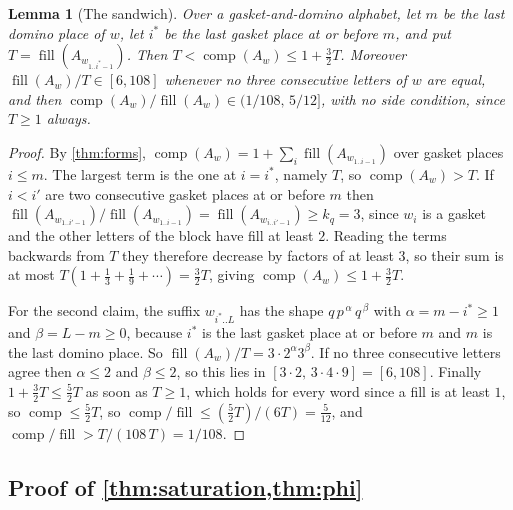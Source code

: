 \documentclass[11pt]{amsart}
\newtheorem{lemma}[theorem]{Lemma}
\theoremstyle{definition}
\theoremstyle{remark}
\DeclareMathOperator{\comp}{comp}
\DeclareMathOperator{\fil}{fill}
\begin{document}
\begin{lemma}[The sandwich]
\label{lem:sandwich}
Over a gasket-and-domino alphabet, let $m$ be the last domino place of $w$, let $i^*$ be the last gasket place at or before $m$, and put $T = \fil(A_{w_{1..i^*-1}})$. Then $T < \comp(A_w) \le 1 + \tfrac32 T$. Moreover $\fil(A_w)/T \in [6, 108]$ whenever no three consecutive letters of $w$ are equal, and then $\comp(A_w)/\fil(A_w) \in (1/108,\, 5/12]$, with no side condition, since $T \ge 1$ always.
\end{lemma}

\begin{proof}
By \cref{thm:forms}, $\comp(A_w) = 1 + \sum_i \fil(A_{w_{1..i-1}})$ over gasket places $i \le m$. The largest term is the one at $i = i^*$, namely $T$, so $\comp(A_w) > T$. If $i < i'$ are two consecutive gasket places at or before $m$ then $\fil(A_{w_{1..i'-1}})/\fil(A_{w_{1..i-1}}) = \fil(A_{w_{i..i'-1}}) \ge k_q = 3$, since $w_i$ is a gasket and the other letters of the block have fill at least $2$. Reading the terms backwards from $T$ they therefore decrease by factors of at least $3$, so their sum is at most $T(1 + \tfrac13 + \tfrac19 + \cdots) = \tfrac32 T$, giving $\comp(A_w) \le 1 + \tfrac32 T$.

For the second claim, the suffix $w_{i^*..L}$ has the shape $q\, p^{\,\alpha}\, q^{\,\beta}$ with $\alpha = m - i^* \ge 1$ and $\beta = L - m \ge 0$, because $i^*$ is the last gasket place at or before $m$ and $m$ is the last domino place. So $\fil(A_w)/T = 3 \cdot 2^{\alpha} 3^{\beta}$. If no three consecutive letters agree then $\alpha \le 2$ and $\beta \le 2$, so this lies in $[3 \cdot 2, \, 3 \cdot 4 \cdot 9] = [6, 108]$. Finally $1 + \tfrac32 T \le \tfrac52 T$ as soon as $T \ge 1$, which holds for every word since a fill is at least $1$, so $\comp \le \tfrac52 T$, so $\comp/\fil \le (\tfrac52 T)/(6T) = \tfrac{5}{12}$, and $\comp/\fil > T/(108\,T) = 1/108$.
\end{proof}

\subsection{Proof of \texorpdfstring{\cref{thm:saturation,thm:phi}}{the two counting theorems}}
\end{document}
